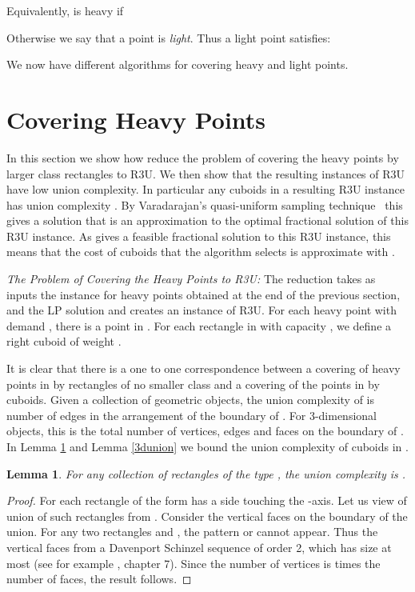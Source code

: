 \documentclass[11pt]{article}
\newtheorem{lemma}[thm]{Lemma}
\begin{document}
Equivalently,  is heavy if 
 
Otherwise we say that a point is {\em light}. Thus a light point satisfies:

We now have different algorithms for covering heavy and light points.

\section{Covering Heavy Points}
\label{sec:heavy}

In this section 
we show how reduce the problem of covering the heavy
points by larger class rectangles to R3U.
We then show that the resulting instances of R3U have low union complexity.
In particular any  cuboids in a resulting R3U instance
has union complexity .
By Varadarajan's quasi-uniform sampling technique~\cite{Varadarajan09}
this gives 
a solution that is an  approximation to the 
optimal fractional solution of this R3U instance. 
As  gives
a feasible fractional solution to this R3U instance, this means
that the cost of cuboids that the algorithm selects is  
approximate with .


\medskip

{\em The Problem of 
Covering the Heavy Points to R3U:} 
The reduction takes as inputs 
the instance  for heavy points obtained at the end of the previous section, and the LP solution  
and creates an instance  of R3U.
For each heavy point  with demand , 
there is a point  in .
For each rectangle  in  with capacity , 
we define a right cuboid 
of weight .


\medskip
It is clear that there is a one to one correspondence between
a covering of heavy points in  by rectangles of no smaller
class and a covering of the points in  by cuboids. 
Given a collection  of  geometric objects, the union complexity of  is
number of edges in the arrangement of the boundary of . For 3-dimensional objects, this is the 
total number of vertices, edges and faces on the boundary of . 
In Lemma \ref{2dunion} and Lemma \ref{3dunion}
we bound the union complexity of cuboids in .

\begin{lemma}
\label{2dunion}
For any collection of  rectangles of the type  , the union complexity  is .
\end{lemma}
\begin{proof}
For each rectangle of the form  has a side touching the -axis. Let us view of union of  such rectangles from . Consider the vertical faces on the boundary of the union.
For any two rectangles  and , the pattern  or  cannot appear. Thus the vertical faces from a Davenport Schinzel sequence of order 2, which has size at most  (see for example \cite{Mat}, chapter 7). Since the number of vertices is  times the number of faces, the result follows. 
\end{proof}
\end{document}
